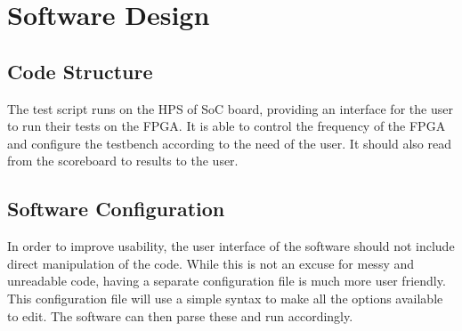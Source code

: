 \section{Software Design}

\subsection{Code Structure}
The test script runs on the HPS of SoC board, providing an interface for the user to run their tests on the FPGA.
It is able to control the frequency of the FPGA and configure the testbench according to the need of the user.
It should also read from the scoreboard to results to the user.

\subsection{Software Configuration}
In order to improve usability, the user interface of the software should not include direct manipulation of the code.
While this is not an excuse for messy and unreadable code, having a separate configuration file is much more user friendly.
This configuration file will use a simple syntax to make all the options available to edit.
The software can then parse these and run accordingly.
